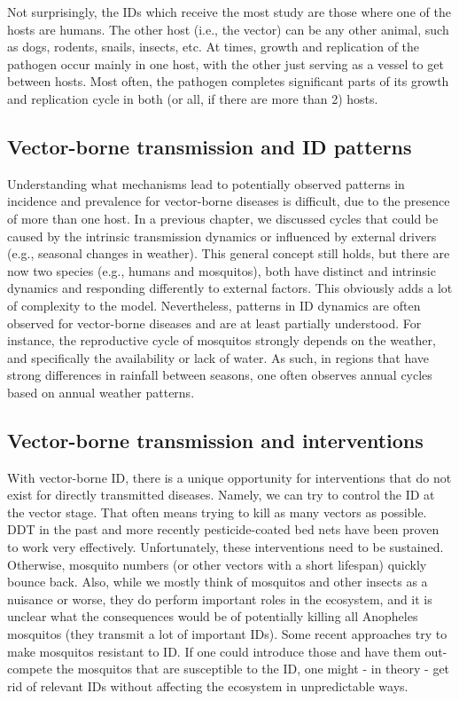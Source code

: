 \documentclass[]{book}
\theoremstyle{definition}
\theoremstyle{definition}
\theoremstyle{definition}
\theoremstyle{remark}
\begin{document}
Not surprisingly, the IDs which receive the most study are those where
one of the hosts are humans. The other host (i.e., the vector) can be
any other animal, such as dogs, rodents, snails, insects, etc. At times,
growth and replication of the pathogen occur mainly in one host, with
the other just serving as a vessel to get between hosts. Most often, the
pathogen completes significant parts of its growth and replication cycle
in both (or all, if there are more than 2) hosts.

\subsection{Vector-borne transmission and ID
patterns}\label{vector-borne-transmission-and-id-patterns}

Understanding what mechanisms lead to potentially observed patterns in
incidence and prevalence for vector-borne diseases is difficult, due to
the presence of more than one host. In a previous chapter, we discussed
cycles that could be caused by the intrinsic transmission dynamics or
influenced by external drivers (e.g., seasonal changes in weather). This
general concept still holds, but there are now two species (e.g., humans
and mosquitos), both have distinct and intrinsic dynamics and responding
differently to external factors. This obviously adds a lot of complexity
to the model. Nevertheless, patterns in ID dynamics are often observed
for vector-borne diseases and are at least partially understood. For
instance, the reproductive cycle of mosquitos strongly depends on the
weather, and specifically the availability or lack of water. As such, in
regions that have strong differences in rainfall between seasons, one
often observes annual cycles based on annual weather patterns.

\subsection{Vector-borne transmission and
interventions}\label{vector-borne-transmission-and-interventions}

With vector-borne ID, there is a unique opportunity for interventions
that do not exist for directly transmitted diseases. Namely, we can try
to control the ID at the vector stage. That often means trying to kill
as many vectors as possible. DDT in the past and more recently
pesticide-coated bed nets have been proven to work very effectively.
Unfortunately, these interventions need to be sustained. Otherwise,
mosquito numbers (or other vectors with a short lifespan) quickly bounce
back. Also, while we mostly think of mosquitos and other insects as a
nuisance or worse, they do perform important roles in the ecosystem, and
it is unclear what the consequences would be of potentially killing all
Anopheles mosquitos (they transmit a lot of important IDs). Some recent
approaches try to make mosquitos resistant to ID. If one could introduce
those and have them out-compete the mosquitos that are susceptible to
the ID, one might - in theory - get rid of relevant IDs without
affecting the ecosystem in unpredictable ways.
\end{document}
